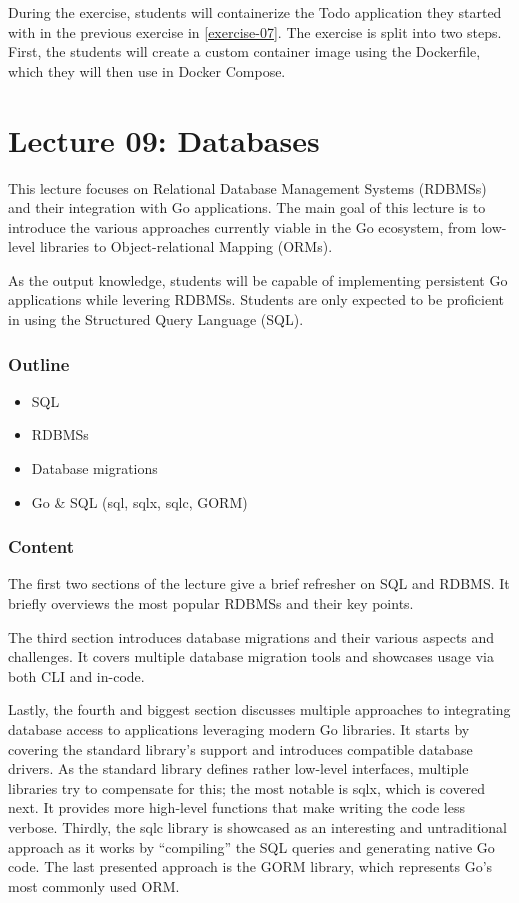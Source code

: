 \documentclass[
  digital,
  color,
  oneside,
  nosansbold,
  nocolorbold,
  nolof,
  nolot,
]{fithesis4}
\begin{document}
During the exercise, students will containerize the Todo application they started with in the previous exercise in \cref{exercise-07}. The exercise is split into two steps. First, the students will create a custom container image using the Dockerfile, which they will then use in Docker Compose.

\section{Lecture 09: Databases}\label{lecture-databases}

This lecture focuses on Relational Database Management Systems (RDBMSs) and their integration with Go applications. The main goal of this lecture is to introduce the various approaches currently viable in the Go ecosystem, from low-level libraries to Object-relational Mapping (ORMs).

As the output knowledge, students will be capable of implementing persistent Go applications while levering RDBMSs. Students are only expected to be proficient in using the Structured Query Language (SQL).

\subsubsection{Outline}

\begin{itemize}
    \item SQL
    \item RDBMSs
    \item Database migrations
    \item Go \& SQL (sql, sqlx, sqlc, GORM)
\end{itemize}

\subsubsection{Content}

The first two sections of the lecture give a brief refresher on SQL and RDBMS. It briefly overviews the most popular RDBMSs and their key points.

The third section introduces database migrations and their various aspects and challenges. It covers multiple database migration tools and showcases usage via both CLI and in-code.

Lastly, the fourth and biggest section discusses multiple approaches to integrating database access to applications leveraging modern Go libraries. It starts by covering the
standard library's support and introduces compatible database drivers. As the standard library defines rather low-level interfaces, multiple libraries try to compensate for this; the most notable is sqlx\cite{sqlx}, which is covered next. It provides more high-level functions that make writing the code less verbose. Thirdly, the sqlc\cite{sqlc} library is showcased as an interesting and untraditional approach as it works by \enquote{compiling} the SQL queries and generating native Go code. The last presented approach is the GORM\cite{gorm} library, which represents Go's most commonly used ORM.
\end{document}
